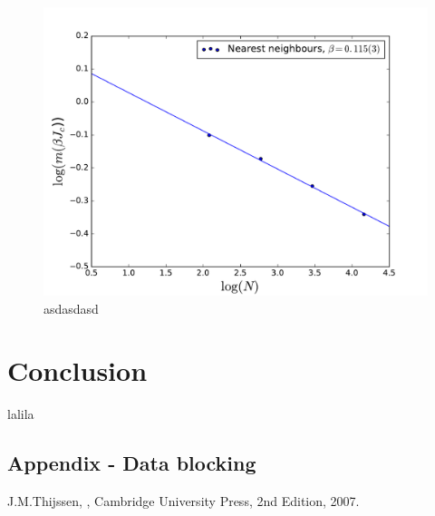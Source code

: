 \documentclass[twoside]{article}
\begin{document}
\begin{multicols}{2}
\begin{figure}[H]
\centering
\includegraphics[scale=0.4]{images/plot_magnetization.pdf}
\caption{asdasdasd}
\end{figure}



\section{Conclusion}
lalila

\begin{appendices}
\section{Appendix - Data blocking}

\end{appendices}


\begin{thebibliography}{99} %

J.M.Thijssen,
, Cambridge University Press, 2nd Edition, 2007.
\end{thebibliography}

\end{multicols}
\end{document}
